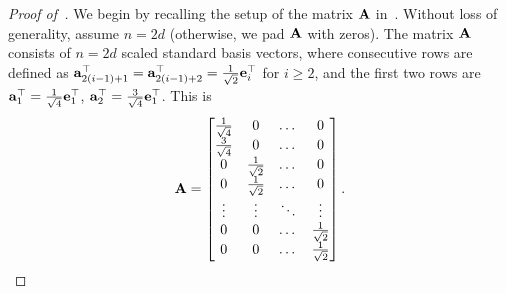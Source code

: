 \documentclass[11pt,a4paper]{article}
\begin{document}
\begin{proof}[Proof of~]
We begin by recalling the setup of the matrix $\mathbf{A}$ in~\citet[Theorem~10]{derezinski2021sparse}. 
Without loss of generality, assume  $n = 2d$ (otherwise, we pad $\mathbf{A}$ with zeros). The matrix $\mathbf{A}$  consists of $n = 2d$ scaled standard basis vectors, where consecutive rows are defined as $\mathbf{a}^{\top}_{2(i-1)+1} =\mathbf{a}^{\top}_{2(i-1)+2} =\frac{1}{\sqrt{2}} \mathbf{e}^{\top}_i$ for $i \geq 2$, and the first two rows are $\mathbf{a}^{\top}_1 =\frac{1}{ \sqrt{4}} \mathbf{e}^{\top}_1$,  $  \mathbf{a}^{\top}_2 =\frac{3}{ \sqrt{4}}\mathbf{e}^{\top}_1$. 
This is
\begin{align*}
    \mathbf{A} = \begin{bmatrix}
\frac{1}{ \sqrt{4}} & 0 & \dots & 0 \\
\frac{3}{\sqrt{4}} & 0 & \dots & 0 \\
0 &\frac{1}{ \sqrt{2}} & \dots & 0 \\
0 &\frac{1}{ \sqrt{2}} & \dots & 0 \\
\vdots & \vdots & \ddots & \vdots \\
0 & 0 & \dots & \frac{1}{ \sqrt{2}}\\
0 & 0 & \dots & \frac{1}{ \sqrt{2}}
\end{bmatrix}.
\end{align*}


\end{proof}
\end{document}
